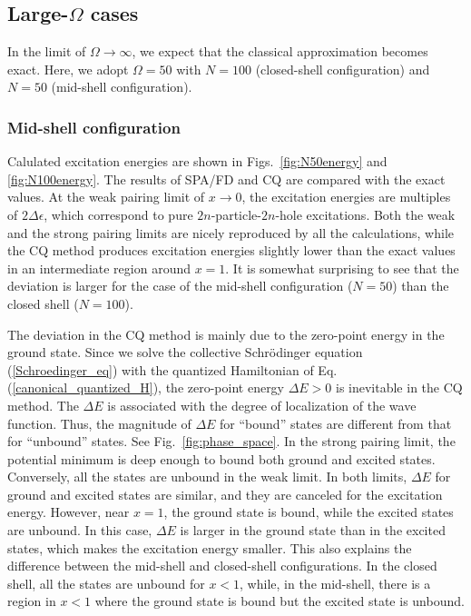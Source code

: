 \documentclass[%
superscriptaddress,
preprint,
showpacs,
nofootinbib,
amsmath,amssymb,
prc,
floatfix ]%
{revtex4-1}
\begin{document}
\subsection{Large-$\Omega$ cases}

In the limit of $\Omega\rightarrow\infty$,
we expect that the classical approximation becomes exact.
Here, we adopt $\Omega=50$ with $N=100$ (closed-shell configuration)
and $N=50$ (mid-shell configuration).

\subsubsection{Mid-shell configuration}

Calulated excitation energies are shown in Figs.~\ref{fig:N50energy}
and \ref{fig:N100energy}.
The results of SPA/FD and CQ are compared with the exact values.
At the weak pairing limit of $x\rightarrow 0$,
the excitation energies are multiples of $2\Delta\epsilon$, 
which correspond to pure $2n$-particle-$2n$-hole excitations.
Both the weak and the strong pairing limits
are nicely reproduced by all the calculations,
while the CQ method produces excitation energies slightly lower than the
exact values in an intermediate region around $x=1$.
It is somewhat surprising to see that the deviation is larger for
the case of the mid-shell configuration ($N=50$) than the closed shell
($N=100$).


The deviation in the CQ method is mainly due to the zero-point energy
in the ground state.
Since we solve the collective Schr\"odinger equation (\ref{Schroedinger_eq})
with the quantized Hamiltonian of Eq. (\ref{canonical_quantized_H}),
the zero-point energy $\Delta E>0$ is inevitable in the CQ method.
The $\Delta E$ is associated with the degree of localization of
the wave function.
Thus, the magnitude of $\Delta E$ for ``bound'' states are different
from that for ``unbound'' states.
See Fig.~\ref{fig:phase_space}.
In the strong pairing limit, the potential minimum is deep enough to bound
both ground and excited states.
Conversely, all the states are unbound in the weak limit.
In both limits, $\Delta E$ for ground and excited states are similar,
and they are canceled for the excitation energy.
However, near $x=1$, the ground state is bound,
while the excited states are unbound.
In this case, $\Delta E$ is larger in the ground state than in the
excited states, which makes the excitation energy smaller.
This also explains the difference between the mid-shell and closed-shell
configurations.
In the closed shell, all the states are unbound for $x<1$,
while, in the mid-shell,
there is a region in $x<1$ where the ground state is bound but
the excited state is unbound.
\end{document}
